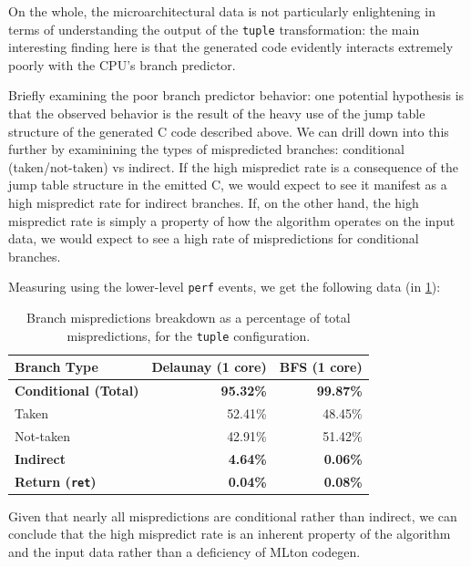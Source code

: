 \documentclass[leqno,11pt]{article}
\begin{document}
On the whole, the microarchitectural data is not particularly enlightening in
terms of understanding the output of the \texttt{tuple} transformation: the main
interesting finding here is that the generated code evidently interacts
extremely poorly with the CPU's branch predictor.

Briefly examining the poor branch predictor behavior: one potential hypothesis
is that the observed behavior is the result of the heavy use of the jump table
structure of the generated C code described above. We can drill down into this
further by examinining the types of mispredicted branches: conditional
(taken/not-taken) vs indirect. If the high mispredict rate is a consequence of
the jump table structure in the emitted C, we would expect to see it manifest as
a high mispredict rate for indirect branches. If, on the other hand, the high
mispredict rate is simply a property of how the algorithm operates on the input
data, we would expect to see a high rate of mispredictions for conditional
branches.

Measuring using the lower-level \texttt{perf} events, we get the following data
(in \cref{tab:badspec_hierarchical_tuple}):
\begin{table}[htbp]
  \centering
  \caption{Branch mispredictions breakdown as a percentage of total mispredictions, for the \texttt{tuple} configuration.}
  \label{tab:badspec_hierarchical_tuple}
  \begin{tabular}{lrr}
    \toprule
    \textbf{Branch Type} & \textbf{Delaunay (1 core)} & \textbf{BFS (1 core)} \\
    \midrule
    \textbf{Conditional (Total)} & \textbf{95.32\%} & \textbf{99.87\%} \\
    \quad Taken                  & 52.41\%          & 48.45\%          \\
    \quad Not-taken              & 42.91\%          & 51.42\%          \\
    \textbf{Indirect}            &  \textbf{4.64\%} &  \textbf{0.06\%} \\
    \textbf{Return (\texttt{ret})}& \textbf{0.04\%} &  \textbf{0.08\%} \\
    \bottomrule
  \end{tabular}
\end{table}
Given that nearly all mispredictions are conditional rather than indirect, we
can conclude that the high mispredict rate is an inherent property of the
algorithm and the input data rather than a deficiency of MLton codegen.
\end{document}
